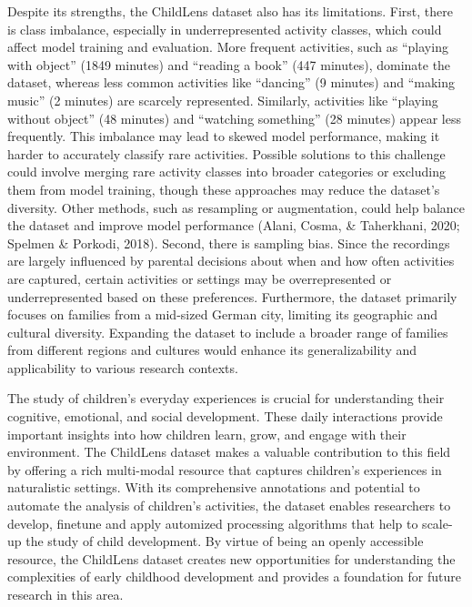 \documentclass[
  man,floatsintext]{apa6}
\begin{document}
Despite its strengths, the ChildLens dataset also has its limitations. First, there is class imbalance, especially in underrepresented activity classes, which could affect model training and evaluation. More frequent activities, such as ``playing with object'' (1849 minutes) and ``reading a book'' (447 minutes), dominate the dataset, whereas less common activities like ``dancing'' (9 minutes) and ``making music'' (2 minutes) are scarcely represented. Similarly, activities like ``playing without object'' (48 minutes) and ``watching something'' (28 minutes) appear less frequently. This imbalance may lead to skewed model performance, making it harder to accurately classify rare activities. Possible solutions to this challenge could involve merging rare activity classes into broader categories or excluding them from model training, though these approaches may reduce the dataset's diversity. Other methods, such as resampling or augmentation, could help balance the dataset and improve model performance (Alani, Cosma, \& Taherkhani, 2020; Spelmen \& Porkodi, 2018). Second, there is sampling bias. Since the recordings are largely influenced by parental decisions about when and how often activities are captured, certain activities or settings may be overrepresented or underrepresented based on these preferences. Furthermore, the dataset primarily focuses on families from a mid-sized German city, limiting its geographic and cultural diversity. Expanding the dataset to include a broader range of families from different regions and cultures would enhance its generalizability and applicability to various research contexts.

The study of children's everyday experiences is crucial for understanding their cognitive, emotional, and social development. These daily interactions provide important insights into how children learn, grow, and engage with their environment. The ChildLens dataset makes a valuable contribution to this field by offering a rich multi-modal resource that captures children's experiences in naturalistic settings. With its comprehensive annotations and potential to automate the analysis of children's activities, the dataset enables researchers to develop, finetune and apply automized processing algorithms that help to scale-up the study of child development. By virtue of being an openly accessible resource, the ChildLens dataset creates new opportunities for understanding the complexities of early childhood development and provides a foundation for future research in this area.
\end{document}
